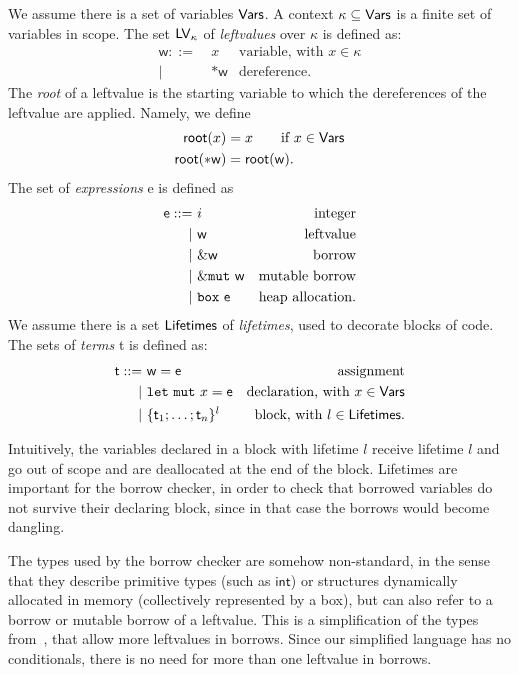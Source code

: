 \begin{definition}
  We assume there is a set of variables $\mathsf{Vars}$.
  A context $\kappa\subseteq\mathsf{Vars}$ is a finite set of variables in scope.
  The set $\mathsf{LV}_\kappa$ of \emph{leftvalues} over $\kappa$ is defined as:
  \begin{align*}
    \mathsf{w} ::= &\ x & \text{variable, with $x\in\kappa$}\\
    | &\ \mathtt{*}\mathsf{w} & \text{dereference.}
  \end{align*}
  The \emph{root} of a leftvalue is the starting variable to which the dereferences of the
  leftvalue are applied. Namely, we define
  \begin{align*}
    \mathsf{root}(x) &= x\qquad\text{if $x\in\mathsf{Vars}$}\\
    \mathsf{root}(\mathtt{*}\mathsf{w}) &= \mathsf{root}(\mathsf{w}).
  \end{align*}
  The set of \emph{expressions} \textsf{e} is defined as
  \begin{align*}
    \mathsf{e} ::= &\ i & \text{integer}\\
    | &\ \mathsf{w} & \text{leftvalue}\\
    | &\ \&\mathsf{w} & \text{borrow}\\
    | &\ \&\mathtt{mut}\ \mathsf{w} & \text{mutable borrow}\\
    | &\ \mathtt{box}\ \mathsf{e} & \text{heap allocation.}
  \end{align*}
  We assume there is a set $\mathsf{Lifetimes}$ of \emph{lifetimes}, used
  to decorate blocks of code.
  The sets of \emph{terms} \textsf{t} is defined as:
  \begin{align*}
    \mathsf{t} ::= &\ \mathsf{w}=\mathsf{e} & \text{assignment}\\
    | &\ \mathtt{let\ mut}\ x=\mathsf{e} & \text{declaration, with $x\in\mathsf{Vars}$}\\
    | &\ \{\mathsf{t}_1;\ldots;\mathsf{t}_n\}^l & \text{block, with $l\in\mathsf{Lifetimes}$.}
  \end{align*}
\end{definition}
%
Intuitively, the variables declared in a block with lifetime $l$ receive lifetime $l$
and go out of scope and are deallocated
at the end of the block. Lifetimes are important for the borrow checker,
in order to check that borrowed variables do not survive their declaring block, since in that
case the borrows would become dangling.

The types used by the borrow checker are somehow non-standard, in the sense
that they describe primitive types (such as $\mathsf{int}$) or structures
dynamically allocated in memory (collectively represented by a box), but can also refer to
a borrow or mutable borrow of a leftvalue.
This is a simplification of the types from~\cite{Pearce21}, that allow more leftvalues
in borrows. Since our simplified language has no conditionals, there is no need for
more than one leftvalue in borrows.

